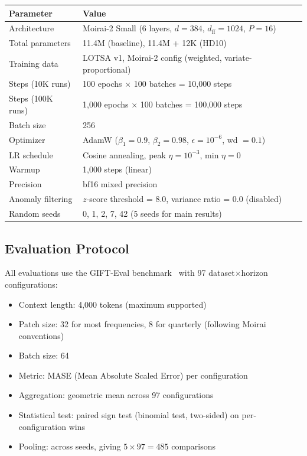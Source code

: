 \documentclass[11pt]{article}
\begin{document}
\begin{center}
\small
\begin{tabular}{ll}
\toprule
\textbf{Parameter} & \textbf{Value} \\
\midrule
Architecture & Moirai-2 Small (6 layers, $d=384$, $d_{\text{ff}}=1024$, $P=16$) \\
Total parameters & 11.4M (baseline), 11.4M + 12K (HD10) \\
Training data & LOTSA v1, Moirai-2 config (weighted, variate-proportional) \\
Steps (10K runs) & 100 epochs $\times$ 100 batches = 10,000 steps \\
Steps (100K runs) & 1,000 epochs $\times$ 100 batches = 100,000 steps \\
Batch size & 256 \\
Optimizer & AdamW ($\beta_1=0.9$, $\beta_2=0.98$, $\epsilon=10^{-6}$, wd $=0.1$) \\
LR schedule & Cosine annealing, peak $\eta = 10^{-3}$, min $\eta = 0$ \\
Warmup & 1,000 steps (linear) \\
Precision & bf16 mixed precision \\
Anomaly filtering & $z$-score threshold = 8.0, variance ratio = 0.0 (disabled) \\
Random seeds & 0, 1, 2, 7, 42 (5 seeds for main results) \\
\bottomrule
\end{tabular}
\end{center}

\subsection{Evaluation Protocol}

All evaluations use the GIFT-Eval benchmark~\citep{vijay2024gifteval} with 97 dataset$\times$horizon configurations:
\begin{itemize}
    \item Context length: 4,000 tokens (maximum supported)
    \item Patch size: 32 for most frequencies, 8 for quarterly (following Moirai conventions)
    \item Batch size: 64
    \item Metric: MASE (Mean Absolute Scaled Error) per configuration
    \item Aggregation: geometric mean across 97 configurations
    \item Statistical test: paired sign test (binomial test, two-sided) on per-configuration wins
    \item Pooling: across seeds, giving $5 \times 97 = 485$ comparisons
\end{itemize}
\end{document}
